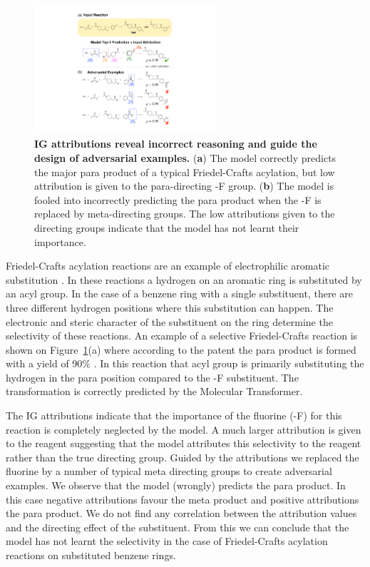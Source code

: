 \begin{figure}[ht!]
    \centering
    \includegraphics[width=0.6\textwidth]{Chapters/Transformer/Figs/sear.pdf}
    \caption{\label{fig:sear} \textbf{IG attributions reveal incorrect reasoning and guide the design of adversarial examples.} (\textbf{a}) The model correctly predicts the major para product of a typical Friedel-Crafts acylation, but low attribution is given to the para-directing -F group. (\textbf{b}) The model is fooled into incorrectly predicting the para product when the -F is replaced by meta-directing groups. The low attributions given to the directing groups indicate that the model has not learnt their importance.}
\end{figure}

Friedel-Crafts acylation reactions are an example of electrophilic aromatic substitution \cite{Friedel1877}. In these reactions a hydrogen on an aromatic ring is substituted by an acyl group. In the case of a benzene ring with a single substituent, there are three different hydrogen positions where this substitution can happen. The electronic and steric character of the substituent on the ring determine the selectivity of these reactions. An example of a selective Friedel-Crafts reaction is shown on Figure~\ref{fig:sear}(a) where according to the patent the para product is formed with a yield of 90\% \cite{fc_para1981}. In this reaction that acyl group is primarily substituting the hydrogen in the para position compared to the -F substituent. The transformation is correctly predicted by the Molecular Transformer. 

The IG attributions indicate that the importance of the fluorine (-F) for this reaction is completely neglected by the model. A much larger attribution is given to the reagent suggesting that the model attributes this selectivity to the reagent rather than the true directing group. Guided by the attributions we replaced the fluorine by a number of typical meta directing groups to create adversarial examples. We observe that the model (wrongly) predicts the para product. In this case negative attributions favour the meta product and positive attributions the para product. We do not find any correlation between the attribution values and the directing effect of the substituent. From this we can conclude that the model has not learnt the selectivity in the case of Friedel-Crafts acylation reactions on substituted benzene rings. 

